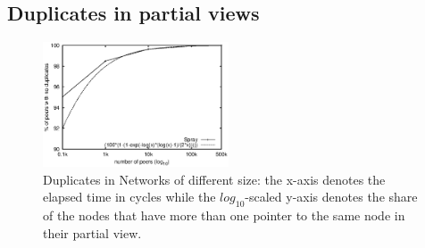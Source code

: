 
\subsection{Duplicates in partial views}
\label{subsec:duplicates}

\begin{figure}
  \centering
  \includegraphics[width=0.49\textwidth]{img/dupl.eps}
  \caption{\label{fig:dupl} Duplicates in Networks of different size: the
    x-axis denotes the elapsed time in cycles while the $log_{10}$-scaled
    y-axis denotes the share of the nodes that have more than one pointer to
    the same node in their partial view.}
\end{figure}

